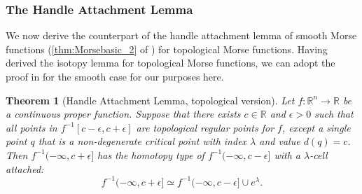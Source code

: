 \documentclass[11pt]{article}
\newcommand{\R}{\mathbb{R}}
\newcommand{\eps}{\epsilon}
\newcommand{\union}{\cup}
\theoremstyle{plain}
\newtheorem{thm}{Theorem}
\theoremstyle{definition}
\theoremstyle{remark}
\begin{document}
	\subsubsection{The Handle Attachment Lemma}
	
	We now derive the counterpart of the handle attachment lemma of smooth Morse functions (\ref{thm:Morsebasic_2} of ) for topological Morse functions. Having derived the isotopy lemma for topological Morse functions, we can adopt the proof in \cite{milnor_morse_1963} for the smooth case for our purposes here. 
	
	\begin{thm}[Handle Attachment Lemma, topological version]
		\label{thm:topological_handle_lemma}
		Let $f : \R^n \to \R$ be a continuous proper function.
		Suppose that there exists $c \in \R$ and $\eps > 0$ such that 
		all points in $f^{-1}[c-\eps,c+\eps]$ are topological regular points for $f$, except a single point $q$ that is a non-degenerate critical point with index $\lambda$ and value $d(q) = c$. 
		Then $f^{-1}(-\infty, c + \eps]$ has the homotopy type of $f^{-1}(-\infty, c - \eps]$ with a $\lambda$-cell attached: 
		\[f^{-1}(-\infty, c + \eps] \simeq f^{-1}(-\infty, c - \eps] \union e^\lambda.\]
	\end{thm}
	
\end{document}
